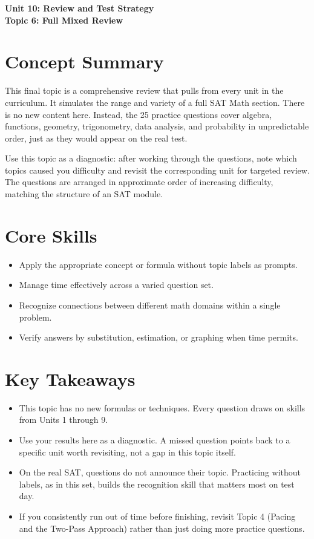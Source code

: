 \documentclass[14pt]{extarticle}
\begin{document}
\raggedright
{}

\begin{center}
    \LARGE \textbf{Unit 10: Review and Test Strategy} \\[6pt]
    \Large \textbf{Topic 6: Full Mixed Review}
\end{center}

\vspace{1em}

\section*{Concept Summary}

This final topic is a comprehensive review that pulls from every unit in the curriculum. It simulates the range and variety of a full SAT Math section. There is no new content here. Instead, the 25 practice questions cover algebra, functions, geometry, trigonometry, data analysis, and probability in unpredictable order, just as they would appear on the real test.

Use this topic as a diagnostic: after working through the questions, note which topics caused you difficulty and revisit the corresponding unit for targeted review. The questions are arranged in approximate order of increasing difficulty, matching the structure of an SAT module.

\section*{Core Skills}
\begin{itemize}
  \item Apply the appropriate concept or formula without topic labels as prompts.
  \item Manage time effectively across a varied question set.
  \item Recognize connections between different math domains within a single problem.
  \item Verify answers by substitution, estimation, or graphing when time permits.
\end{itemize}

\section*{Key Takeaways}
\begin{itemize}
  \item This topic has no new formulas or techniques. Every question draws on skills from Units 1 through 9.
  \item Use your results here as a diagnostic. A missed question points back to a specific unit worth revisiting, not a gap in this topic itself.
  \item On the real SAT, questions do not announce their topic. Practicing without labels, as in this set, builds the recognition skill that matters most on test day.
  \item If you consistently run out of time before finishing, revisit Topic 4 (Pacing and the Two-Pass Approach) rather than just doing more practice questions.
\end{itemize}
\end{document}

